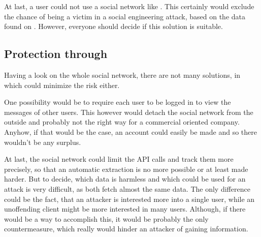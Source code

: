 At last, a user could not use a social network like \Twitter{}. This certainly
would exclude the chance of being a victim in a social engineering attack,
based on the data found on \Twitter{}. However, everyone should decide if this
solution is suitable.


\subsection{Protection through \Twitter{}}

Having a look on the whole social network, there are not many solutions, in
which \Twitter{} could minimize the risk either.

One possibility would be to require each user to be logged in to view the
messages of other users. This however would detach the \Twitter{} social
network from the outside and probably not the right way for a commercial
oriented company. Anyhow, if that would be the case, an account could easily be
made and so there wouldn't be any surplus.

At last, the social network could limit the API calls and track them more
precisely, so that an automatic extraction is no more possible or at least made
harder. But to decide, which data is harmless and which could be used for an
attack is very difficult, as both fetch almost the same data. The only
difference could be the fact, that an attacker is interested more into a single
user, while an unoffending \Twitter{} client might be more interested in many
users. Although, if there would be a way to accomplish this, it would be
probably the only countermeasure, which really would hinder an attacker of
gaining information.

